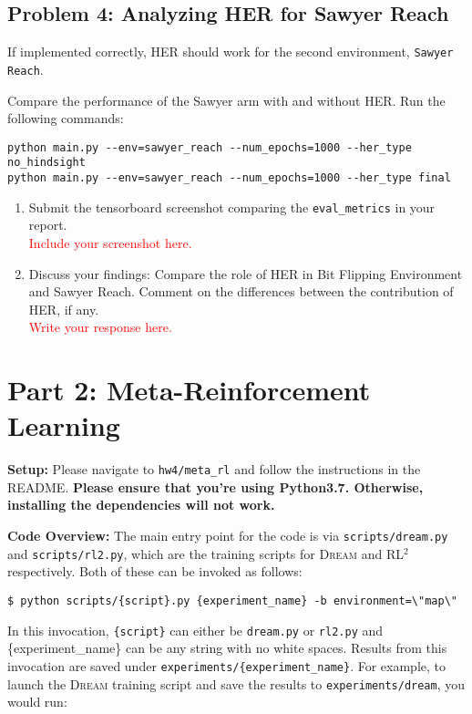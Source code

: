 \documentclass[12pt]{article}
\newcommand{\rl}{{RL$^2$ }}
\newcommand{\dream}{\textsc{Dream }}
\begin{document}
\subsection*{Problem 4: Analyzing HER for Sawyer Reach}
If implemented correctly, HER should work for the second environment, \texttt{Sawyer Reach}.

Compare the performance of the Sawyer arm with and without HER. Run the following commands:

\verb|python main.py --env=sawyer_reach --num_epochs=1000 --her_type no_hindsight| \\
\verb|python main.py --env=sawyer_reach --num_epochs=1000 --her_type final|


\begin{enumerate}[label=\alph*)]
    \item Submit the tensorboard screenshot comparing the \texttt{eval\_metrics} in your report. \\
    \textcolor{red}{Include your screenshot here.}
    \item Discuss your findings: Compare the role of HER in Bit Flipping Environment and Sawyer Reach. Comment on the differences between the contribution of HER, if any. \\
    \textcolor{red}{Write your response here.}
\end{enumerate}

\newpage

\section*{Part 2: Meta-Reinforcement Learning}

\textbf{Setup:} Please navigate to \texttt{hw4/meta\_rl} and follow the instructions in the README. \textbf{Please ensure that you're using Python3.7. Otherwise, installing the dependencies will not work.}

\textbf{Code Overview:} The main entry point for the code is via \texttt{scripts/dream.py} and \texttt{scripts/rl2.py}, which are the training scripts for \dream and \rl respectively.
Both of these can be invoked as follows:

\texttt{\$ python scripts/\{script\}.py \{experiment\_name\} -b environment=\textbackslash"map\textbackslash"}

In this invocation, \texttt{\{script\}} can either be \texttt{dream.py} or \texttt{rl2.py} and \{experiment\_name\} can be any string with no white spaces. Results from this invocation are saved under \texttt{experiments/\{experiment\_name\}}.
For example, to launch the \dream training script and save the results to \texttt{experiments/dream}, you would run:
\end{document}
